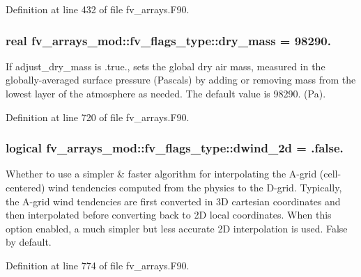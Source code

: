 Definition at line 432 of file fv\-\_\-arrays.\-F90.

\subsubsection[{dry\-\_\-mass}]{\setlength{\rightskip}{0pt plus 5cm}real fv\-\_\-arrays\-\_\-mod\-::fv\-\_\-flags\-\_\-type\-::dry\-\_\-mass = 98290.}\label{structfv__arrays__mod_1_1fv__flags__type_aa20cbdfdf995bbe333674d614490ef07}


If adjust\-\_\-dry\-\_\-mass is .true., sets the global dry air mass, measured in the globally-\/averaged surface pressure (Pascals) by adding or removing mass from the lowest layer of the atmosphere as needed. The default value is 98290. (Pa). 



Definition at line 720 of file fv\-\_\-arrays.\-F90.

\subsubsection[{dwind\-\_\-2d}]{\setlength{\rightskip}{0pt plus 5cm}logical fv\-\_\-arrays\-\_\-mod\-::fv\-\_\-flags\-\_\-type\-::dwind\-\_\-2d = .false.}\label{structfv__arrays__mod_1_1fv__flags__type_a9474d862f9632b749ecc646cc0480e85}


Whether to use a simpler \& faster algorithm for interpolating the A-\/grid (cell-\/centered) wind tendencies computed from the physics to the D-\/grid. Typically, the A-\/grid wind tendencies are first converted in 3\-D cartesian coordinates and then interpolated before converting back to 2\-D local coordinates. When this option enabled, a much simpler but less accurate 2\-D interpolation is used. False by default. 



Definition at line 774 of file fv\-\_\-arrays.\-F90.

